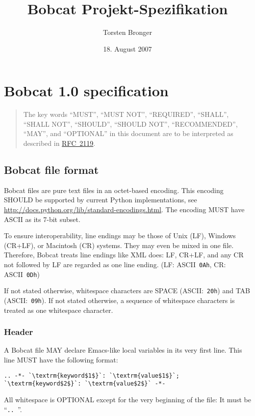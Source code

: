 \documentclass[12pt,openany]{book}
\begin{document}
\title{Bobcat Projekt-Spezifikation}
\author{Torsten Bronger}
\date{18. August 2007}
\maketitle

\tableofcontents


\chapter{Bobcat 1.0 specification}

\begin{quotation}
  The key words ``MUST'', ``MUST NOT'', ``REQUIRED'', ``SHALL'', ``SHALL NOT'',
  ``SHOULD'', ``SHOULD NOT'', ``RECOMMENDED'', ``MAY'', and ``OPTIONAL'' in
  this document are to be interpreted as described in
  \href{http://tools.ietf.org/html/rfc2119}{RFC~2119}.
\end{quotation}
      
\section{Bobcat file format}

Bobcat files are pure text files in an octet-based encoding.  This encoding
SHOULD be supported by current Python implementations, see
\url{http://docs.python.org/lib/standard-encodings.html}.  The encoding MUST
have ASCII as its \mbox{7-bit} subset.

To ensure interoperability, line endings may be those of Unix (LF), Windows
(CR+LF), or Macintosh (CR) systems.  They may even be mixed in one file.
Therefore, Bobcat treats line endings like XML does: LF, CR+LF, and any CR not
followed by LF are regarded as one line ending.  (LF: ASCII~\verb|0Ah|, CR:
ASCII~\verb|0Dh|)

If not stated otherwise, whitespace characters are SPACE (ASCII:~\verb|20h|)
and TAB (ASCII:~\verb|09h|).  If not stated otherwise, a sequence of whitespace
characters is treated as one whitespace character.

\subsection{Header}

A Bobcat file MAY declare Emacs-like local variables in its very first line.
This line MUST have the following format:
\begin{lstlisting}[escapechar=`]
.. -*- `\textrm{keyword$1$}`: `\textrm{value$1$}`; `\textrm{keyword$2$}`: `\textrm{value$2$}` -*-
\end{lstlisting}
All whitespace is OPTIONAL except for the very beginning of the file: It must
be ``\verb*|.. |''.
\end{document}
